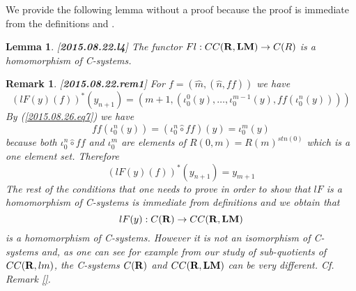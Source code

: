 \documentclass[11pt]{article}
\newtheorem{lemma}[proposition]{Lemma}
\newtheorem{remark}[proposition]{Remark}
\newcommand{\llabel}[1]{\label{#1}[{\bf #1}]}
\newcommand{\sr}{\rightarrow}
\newcommand{\rr}{{\bf R}}
\newcommand{\lm}{{\bf LM}}
\newcommand{\wh}{\widehat}
\newcommand{\hc}{\wh{\circ}}
\begin{document}
We provide the following lemma without a proof because the proof is immediate from the definitions and \cite[Lemma 3.4]{Cfromauniverse}. 
%
\begin{lemma}
\llabel{2015.08.22.l4}
The functor $Fl:CC(\rr,\lm)\sr C(R)$ is a homomorphism of C-systems.
\end{lemma}
%
\begin{remark}\rm
\llabel{2015.08.22.rem1} 
For $f=(\wh{m},(\wh{n},ff))$ we have
%
$$(lF(y)(f))^*(y_{n+1})=(m+1,(\iota_0^0(y),\dots,\iota_0^{m-1}(y),ff(\iota_0^n(y))))$$
%
By (\ref{2015.08.26.eq7}) we have 
%
$$ff(\iota_0^n(y))=(\iota_0^n\hc ff)(y)=\iota_0^m(y)$$
%
because both $\iota_0^n\hc ff$ and $\iota_0^m$ are elements of $R(0,m)=R(m)^{stn(0)}$ which is a one element set. Therefore
%
$$(lF(y)(f))^*(y_{n+1})=y_{m+1}$$
%
The rest of the conditions that one needs to prove in order to show that $lF$ is a homomorphism of C-systems is immediate from definitions and we obtain that 
%
$$lF(y):C(\rr)\sr CC(\rr,\lm)$$
%
is a homomorphism of C-systems.  However it is not an isomorphism of C-systems and, as one can see for example from our study of sub-quotients of $CC(\rr,lm)$, the C-systems $C(\rr)$ and $CC(\rr,\lm)$ can be very different. Cf. Remark \ref{}. 
\end{remark}
%
\end{document}

